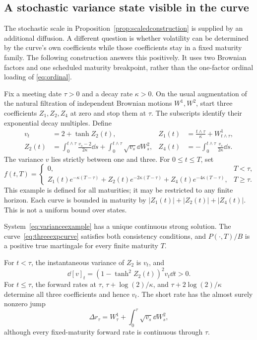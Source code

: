 \subsection{A stochastic variance state visible in the curve}\label{sec:varianceexample}
The stochastic scale in Proposition~\ref{prop:scaledconstruction} is supplied by an additional diffusion. A different question is whether volatility can be determined by the curve's own coefficients while those coefficients stay in a fixed maturity family. The following construction answers this positively. It uses two Brownian factors and one scheduled maturity breakpoint, rather than the one-factor ordinal loading of \eqref{eq:ordinal}.

Fix a meeting date $\tau>0$ and a decay rate $\kappa>0$. On the usual augmentation of the natural filtration of independent Brownian motions $W^1,W^2$, start three coefficients $Z_1,Z_2,Z_4$ at zero and stop them at $\tau$. The subscripts identify their exponential decay multiples. Define
\begin{align}
v_t&=2+\tanh Z_2(t),&
Z_1(t)&=\frac{t\wedge\tau}{\kappa}+W^1_{t\wedge\tau},\nonumber\\
Z_2(t)&=\int_0^{t\wedge\tau}\frac{v_s-2}{2\kappa}\dd s
                  +\int_0^{t\wedge\tau}\sqrt{v_s}\dd W^2_s,&
Z_4(t)&=-\int_0^{t\wedge\tau}\frac{v_s}{2\kappa}\dd s.
\label{eq:varianceexample}
\end{align}
The variance $v$ lies strictly between one and three. For $0\le t\le T$, set
\begin{equation}\label{eq:threeexpcurve}
f(t,T)=\begin{cases}
0,&T<\tau,\\
Z_1(t)e^{-\kappa(T-\tau)}+Z_2(t)e^{-2\kappa(T-\tau)}
                   +Z_4(t)e^{-4\kappa(T-\tau)},&T\ge\tau.
\end{cases}
\end{equation}
This example is defined for all maturities; it may be restricted to any finite horizon. Each curve is bounded in maturity by $|Z_1(t)|+|Z_2(t)|+|Z_4(t)|$. This is not a uniform bound over states.

\begin{proposition}\label{prop:varianceexample}
System~\eqref{eq:varianceexample} has a unique continuous strong solution. The curve~\eqref{eq:threeexpcurve} satisfies both consistency conditions, and $P(\cdot,T)/B$ is a positive true martingale for every finite maturity $T$.

For $t<\tau$, the instantaneous variance of $Z_2$ is $v_t$, and
\[
\dd[v]_t=(1-\tanh^2Z_2(t))^2v_t\dd t>0.
\]
For $t\le\tau$, the forward rates at $\tau$, $\tau+\log(2)/\kappa$, and $\tau+2\log(2)/\kappa$ determine all three coefficients and hence $v_t$. The short rate has the almost surely nonzero jump
\begin{equation}\label{eq:varianceexamplejump}
\Delta r_\tau=W^1_\tau+\int_0^\tau\sqrt{v_s}\dd W^2_s,
\end{equation}
although every fixed-maturity forward rate is continuous through $\tau$.
\end{proposition}

